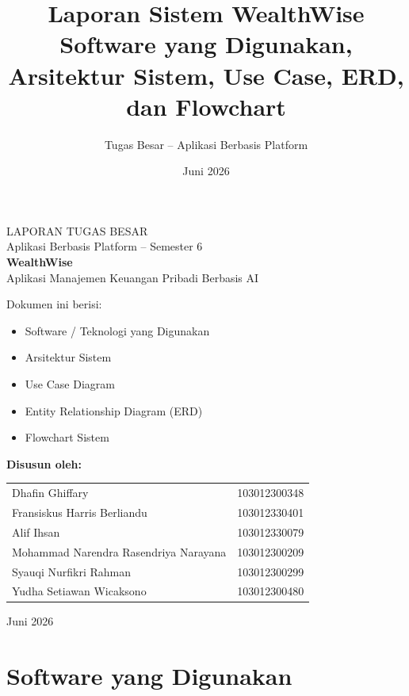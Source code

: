 \documentclass[11pt]{article}
\title{\textbf{Laporan Sistem WealthWise}\\[0.3em]
\large Software yang Digunakan, Arsitektur Sistem, Use Case, ERD, dan Flowchart}
\author{Tugas Besar -- Aplikasi Berbasis Platform}
\date{Juni 2026}
\begin{document}
\begin{titlepage}
\centering
\vspace*{2.5cm}

{\Large LAPORAN TUGAS BESAR}\\[0.2cm]
{\large Aplikasi Berbasis Platform -- Semester 6}\\[2.5cm]

{\Huge \textbf{WealthWise}}\\[0.4cm]
{\large Aplikasi Manajemen Keuangan Pribadi Berbasis AI}\\[2.5cm]

\begin{minipage}{0.8\textwidth}
\centering
Dokumen ini berisi:
\begin{itemize}[leftmargin=4cm]
\item Software / Teknologi yang Digunakan
\item Arsitektur Sistem
\item Use Case Diagram
\item Entity Relationship Diagram (ERD)
\item Flowchart Sistem
\end{itemize}
\end{minipage}

\vspace{3cm}

\textbf{Disusun oleh:}\\[0.4cm]
\begin{tabular}{ll}
Dhafin Ghiffary & 103012300348 \\
Fransiskus Harris Berliandu & 103012330401 \\
Alif Ihsan & 103012330079 \\
Mohammad Narendra Rasendriya Narayana & 103012300209 \\
Syauqi Nurfikri Rahman & 103012300299 \\
Yudha Setiawan Wicaksono & 103012300480 \\
\end{tabular}

\vfill
Juni 2026
\end{titlepage}

\tableofcontents
\newpage

\section{Software yang Digunakan}
\end{document}
